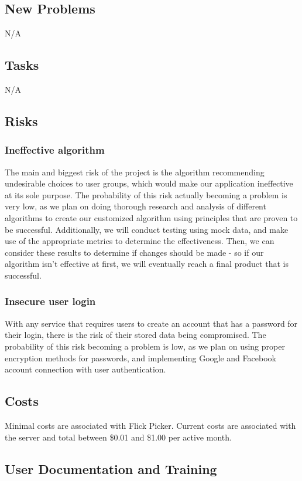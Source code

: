 \documentclass[12pt]{article}
\begin{document}
\subsection{New Problems}
N/A

\subsection{Tasks}
N/A

\subsection{Risks}

\subsubsection{Ineffective algorithm}
 The main and biggest risk of the project is the algorithm recommending undesirable choices to user groups, which would make our application ineffective at its sole purpose. The probability of this risk actually becoming a problem is very low, as we plan on doing thorough research and analysis of different algorithms to create our customized algorithm using principles that are proven to be successful. Additionally, we will conduct testing using mock data, and make use of the appropriate metrics to determine the effectiveness. Then, we can consider these results to determine if changes should be made - so if our algorithm isn't effective at first, we will eventually reach a final product that is successful.
\subsubsection{Insecure user login}
With any service that requires users to create an account that has a password for their login, there is the risk of their stored data being compromised. The probability of this risk becoming a problem is low, as we plan on using proper encryption methods for passwords, and implementing Google and Facebook account connection with user authentication.



\subsection{Costs}
Minimal costs are associated with Flick Picker. Current costs are associated with the server and total between \$0.01 and \$1.00 per active month.

\subsection{User Documentation and Training}
\end{document}
